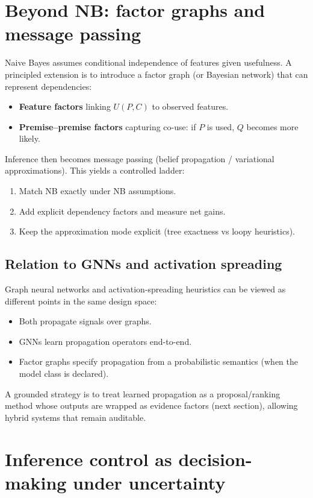 \documentclass[11pt]{article}
\begin{document}
\section{Beyond NB: factor graphs and message passing}

Naive Bayes assumes conditional independence of features given usefulness.
A principled extension is to introduce a factor graph (or Bayesian network) that can represent dependencies:
\begin{itemize}[leftmargin=2em]
\item \textbf{Feature factors} linking $U(P,C)$ to observed features.
\item \textbf{Premise--premise factors} capturing co-use: if $P$ is used, $Q$ becomes more likely.
\end{itemize}

Inference then becomes message passing (belief propagation / variational approximations).
This yields a controlled ladder:
\begin{enumerate}[leftmargin=2em]
\item Match NB exactly under NB assumptions.
\item Add explicit dependency factors and measure net gains.
\item Keep the approximation mode explicit (tree exactness vs loopy heuristics).
\end{enumerate}

\subsection{Relation to GNNs and activation spreading}

Graph neural networks and activation-spreading heuristics can be viewed as different points in the same design space:
\begin{itemize}[leftmargin=2em]
\item Both propagate signals over graphs.
\item GNNs learn propagation operators end-to-end.
\item Factor graphs specify propagation from a probabilistic semantics (when the model class is declared).
\end{itemize}

A grounded strategy is to treat learned propagation as a proposal/ranking method whose outputs are wrapped as
evidence factors (next section), allowing hybrid systems that remain auditable.

\section{Inference control as decision-making under uncertainty}
\end{document}
